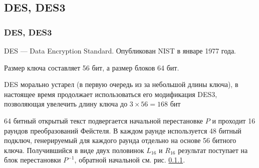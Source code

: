 \subsection{DES, DES3}


\begin{frame}
    \frametitle{DES, DES3}
    
    DES --- Data Encryption Standard. Опубликован NIST в январе 1977 года.
    
    Размер ключа составляет 56 бит, а размер блоков 64 бит. 
    
    DES морально устарел (в первую очередь из за небольшой длины ключа), в настоящее время продолжает использоваться его модификация DES3, позволяющая увелечить длину ключа до $3\times 56=168$ бит
\end{frame}


64 битный открытый текст подвергается начальной перестановке $P$ и проходит 16 раундов преобразований Фейстеля. В каждом раунде используется 48 битный подключ, генерируемый для каждого раунда отдельно на основе 56 битного ключа. Получившийся в виде двух половинок $L_16$ и $R_16$ результат поступает на блок перестановки $P^{-1}$, обратной начальной см. рис. \ref{}. %

